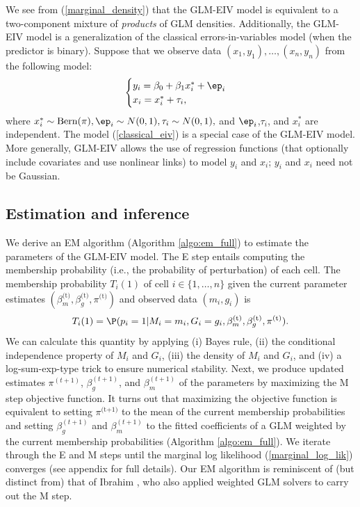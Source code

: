 \documentclass[12pt]{article}
\begin{document}
We see from (\ref{marginal_density}) that the GLM-EIV model is equivalent to a two-component mixture of \textit{products} of GLM densities. Additionally, the GLM-EIV model is a generalization of the classical errors-in-variables model (when the predictor is binary). Suppose that we observe data $(x_1, y_1), \dots, (x_n, y_n)$ from the following model:
\begin{equation}\label{classical_eiv}
\begin{cases}
y_i = \beta_0 + \beta_1 x^*_i + \ep_i \\
x_i = x^*_i + \tau_i,
\end{cases}
\end{equation}
where $x^*_i \sim \textrm{Bern}(\pi), \ep_i \sim N(0,1), \tau_i \sim N(0,1),$ and $\ep_i$,$\tau_i$, and $x^*_i$ are independent. The model (\ref{classical_eiv}) is a special case of the GLM-EIV model. More generally, GLM-EIV allows the use of regression functions (that optionally include covariates and use nonlinear links) to model $y_i$ and $x_i$; $y_i$ and $x_i$ need not be Gaussian.

\subsection{Estimation and inference}

We derive an EM algorithm (Algorithm \ref{algo:em_full}) to estimate the parameters of the GLM-EIV model. The E step entails computing the membership probability (i.e., the probability of perturbation) of each cell. The membership probability $T_i(1)$ of cell $i \in \{1, \dots, n\}$ given the current parameter estimates $(\beta_m^\textrm{(t)}, \beta_g^\textrm{(t)}, \pi^\textrm{(t)})$ and observed data $(m_i, g_i)$ is
$$T_i(1) = \P(p_i = 1| M_i = m_i, G_i = g_i, \beta^\textrm{(t)}_m, \beta^\textrm{(t)}_g, \pi^\textrm{(t)}).$$ We can calculate this quantity by applying (i) Bayes rule, (ii) the conditional independence property of $M_i$ and $G_i$, (iii) the density of $M_i$ and $G_i$, and (iv) a log-sum-exp-type trick to ensure numerical stability. Next, we produce updated estimates $\pi^{(t +1)}$, $\beta_g^{(t+1)}$, and $\beta_m^{(t+1)}$ of the parameters by maximizing the M step objective function. It turns out that maximizing the objective function is equivalent to setting $\pi^{\textrm{(t+1)}}$ to the mean of the current membership probabilities and setting $\beta_g^{(t+1)}$ and $\beta_m^{(t+1)}$ to the fitted coefficients of a GLM weighted by the current membership probabilities (Algorithm \ref{algo:em_full}). We iterate through the E and M steps until the marginal log likelihood (\ref{marginal_log_lik}) converges (see appendix for full details). Our EM algorithm is reminiscent of (but distinct from) that of Ibrahim \cite{Ibrahim1990}, who also applied weighted GLM solvers to carry out the M step.
\end{document}

